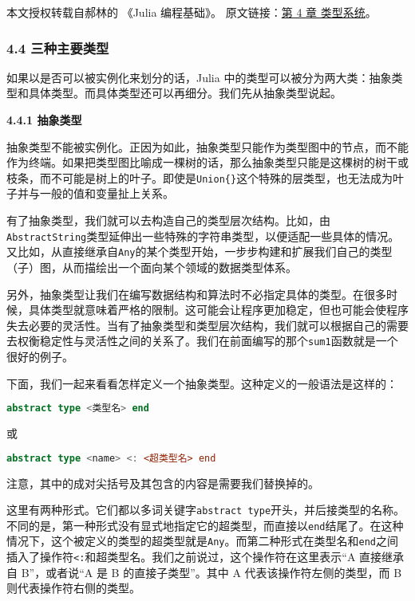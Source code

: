 
本文授权转载自郝林的 《Julia 编程基础》。 原文链接：\href{https://github.com/hyper0x/JuliaBasics/blob/master/book/ch04.md}{第 4 章 类型系统}。


\subsubsection{4.4 三种主要类型}

如果以是否可以被实例化来划分的话，Julia 中的类型可以被分为两大类：抽象类型和具体类型。而具体类型还可以再细分。我们先从抽象类型说起。

\textbf{4.4.1 抽象类型}

抽象类型不能被实例化。正因为如此，抽象类型只能作为类型图中的节点，而不能作为终端。如果把类型图比喻成一棵树的话，那么抽象类型只能是这棵树的树干或枝条，而不可能是树上的叶子。即使是\verb`Union{}`这个特殊的层类型，也无法成为叶子并与一般的值和变量扯上关系。

有了抽象类型，我们就可以去构造自己的类型层次结构。比如，由\verb`AbstractString`类型延伸出一些特殊的字符串类型，以便适配一些具体的情况。又比如，从直接继承自\verb`Any`的某个类型开始，一步步构建和扩展我们自己的类型（子）图，从而描绘出一个面向某个领域的数据类型体系。

另外，抽象类型让我们在编写数据结构和算法时不必指定具体的类型。在很多时候，具体类型就意味着严格的限制。这可能会让程序更加稳定，但也可能会使程序失去必要的灵活性。当有了抽象类型和类型层次结构，我们就可以根据自己的需要去权衡稳定性与灵活性之间的关系了。我们在前面编写的那个\verb`sum1`函数就是一个很好的例子。

下面，我们一起来看看怎样定义一个抽象类型。这种定义的一般语法是这样的：

\begin{lstlisting}[language=julia]
abstract type <类型名> end 
\end{lstlisting}

或

\begin{lstlisting}[language=julia]
abstract type <name> <: <超类型名> end
\end{lstlisting}

注意，其中的成对尖括号及其包含的内容是需要我们替换掉的。

这里有两种形式。它们都以多词关键字\verb`abstract type`开头，并后接类型的名称。不同的是，第一种形式没有显式地指定它的超类型，而直接以\verb`end`结尾了。在这种情况下，这个被定义的类型的超类型就是\verb`Any`。而第二种形式在类型名和\verb`end`之间插入了操作符\verb`<:`和超类型名。我们之前说过，这个操作符在这里表示“A 直接继承自 B”，或者说“A 是 B 的直接子类型”。其中 A 代表该操作符左侧的类型，而 B 则代表操作符右侧的类型。

